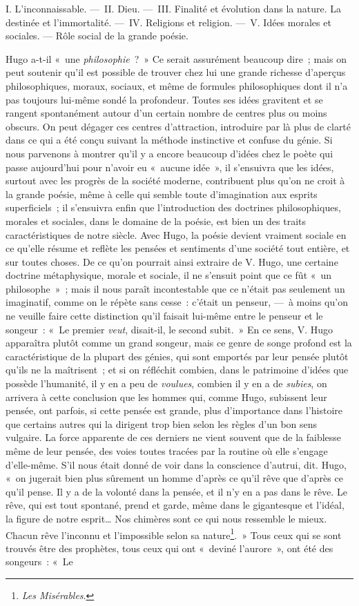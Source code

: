 \documentclass[french,twoside]{book} %
\newcommand\chaptercont{} %
\begin{document}
\chaptercont
\noindent I. L’inconnaissable. — II. Dieu. — III. Finalité et évolution dans la nature. La destinée et l’immortalité. — IV. Religions et religion. — V. Idées morales et sociales. — Rôle social de la grande poésie.\par
Hugo a-t-il « une \emph{philosophie} ? » Ce serait assurément beaucoup dire ; mais on peut soutenir qu’il est possible de trouver chez lui une grande richesse d’aperçus philosophiques, moraux, sociaux, et même de formules philosophiques dont il n’a pas toujours lui-même sondé la profondeur. Toutes ses idées gravitent et se rangent spontanément autour d’un certain nombre de centres plus ou moins obscurs. On peut dégager ces centres d’attraction, introduire par là plus de clarté dans ce qui a été conçu suivant la méthode instinctive et confuse du génie. Si nous parvenons à montrer qu’il y a encore beaucoup d’idées chez le poète qui passe aujourd’hui pour n’avoir eu « aucune idée », il s’ensuivra que les idées, surtout avec les progrès de la société moderne, contribuent plus qu’on ne croit à la grande poésie, même à celle qui semble toute d’imagination aux esprits superficiels ; il s’ensuivra enfin que l’introduction des doctrines philosophiques, morales et sociales, dans le domaine de la poésie, est bien un des traits caractéristiques de notre siècle. Avec Hugo, la poésie devient vraiment sociale en ce qu’elle résume et reflète les pensées et sentiments d’une société tout entière, et sur toutes choses. De ce qu’on pourrait ainsi extraire de V. Hugo, une certaine doctrine métaphysique, morale et sociale, il ne s’ensuit point que ce fût « un philosophe » ; mais il nous paraît incontestable que ce n’était pas seulement un imaginatif, comme on le répète sans cesse : c’était un penseur, — à moins qu’on ne veuille faire cette distinction qu’il faisait lui-même entre le penseur et le songeur : « Le premier \emph{veut}, disait-il, le second subit. » En ce sens, V. Hugo apparaîtra plutôt comme un grand songeur, mais ce genre de songe profond est la caractéristique de la plupart des génies, qui sont emportés par leur pensée plutôt qu’ils ne la maîtrisent ; et si on réfléchit combien, dans le patrimoine d’idées que possède l’humanité, il y en a peu de \emph{voulues}, combien il y en a de \emph{subies}, on arrivera à cette conclusion que les hommes qui, comme Hugo, subissent leur pensée, ont parfois, si cette pensée est grande, plus d’importance dans l’histoire que certains autres qui la dirigent trop bien selon les règles d’un bon sens vulgaire. La force apparente de ces derniers ne vient souvent que de la faiblesse même de leur pensée, des voies toutes tracées par la routine où elle s’engage d’elle-même. S’il nous était donné de voir dans la conscience d’autrui, dit. Hugo, « on jugerait bien plus sûrement un homme d’après ce qu’il rêve que d’après ce qu’il pense. Il y a de la volonté dans la pensée, et il n’y en a pas dans le rêve. Le rêve, qui est tout spontané, prend et garde, même dans le gigantesque et l’idéal, la figure de notre esprit… Nos chimères sont ce qui nous ressemble le mieux. Chacun rêve l’inconnu et l’impossible selon sa nature\footnote{\emph{Les Misérables}.}. » Tous ceux qui se sont trouvés être des prophètes, tous ceux qui ont « deviné l’aurore », ont été des songeurs : « Le 
\end{document}
